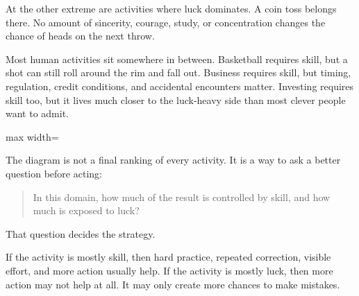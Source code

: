 At the other extreme are activities where luck dominates. A coin toss belongs there. No amount of sincerity, courage, study, or concentration changes the chance of heads on the next throw.

Most human activities sit somewhere in between. Basketball requires skill, but a shot can still roll around the rim and fall out. Business requires skill, but timing, regulation, credit conditions, and accidental encounters matter. Investing requires skill too, but it lives much closer to the luck-heavy side than most clever people want to admit.

\begin{center}
\begin{adjustbox}{max width=\linewidth}
\end{adjustbox}
\end{center}

The diagram is not a final ranking of every activity. It is a way to ask a better question before acting:

\begin{quote}
In this domain, how much of the result is controlled by skill, and how much is exposed to luck?
\end{quote}

That question decides the strategy.

If the activity is mostly skill, then hard practice, repeated correction, visible effort, and more action usually help. If the activity is mostly luck, then more action may not help at all. It may only create more chances to make mistakes.

